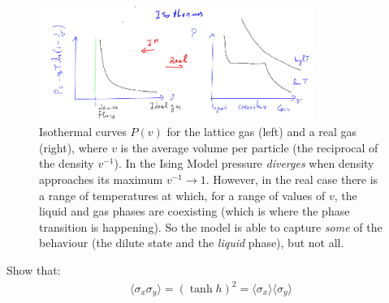 \documentclass[../template.tex]{subfiles}
\begin{document}
\begin{figure}[H]
    \centering
    \includegraphics[width=0.8\textwidth]{image015.png}
    \caption{Isothermal curves $P(v)$ for the lattice gas (left) and a real gas (right), where $v$ is the average volume per particle (the reciprocal of the density $v^{-1}$). In the Ising Model pressure \textit{diverges} when density approaches its maximum $v^{-1} \to 1$. However, in the real case there is a range of temperatures at which, for a range of values of $v$, the liquid and gas phases are coexisting (which is where the phase transition is happening). So the model is able to capture \textit{some} of the behaviour (the dilute  state and the \textit{liquid} phase), but not all. 
    \label{fig:pressure}} 
\end{figure} 

\begin{exo}
    Show that:
    \begin{align*}
        \langle \sigma_x \sigma_y \rangle = (\tanh h)^2 = \langle \sigma_x \rangle \langle \sigma_y \rangle
    \end{align*} %
\end{exo}
\end{document}
